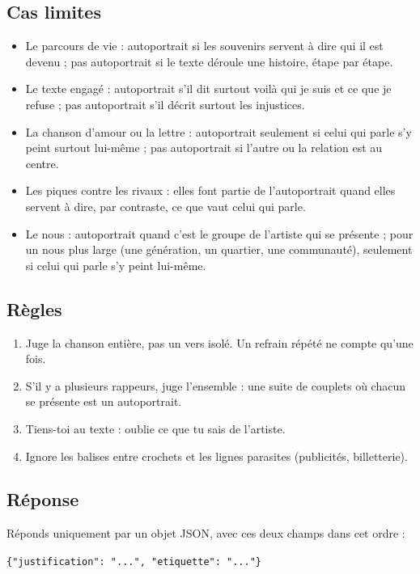 \subsection*{Cas limites}
\begin{itemize}
\item Le parcours de vie : autoportrait si les souvenirs servent à dire qui il est devenu ; pas autoportrait si le texte déroule une histoire, étape par étape.
\item Le texte engagé : autoportrait s'il dit surtout \og voilà qui je suis et ce que je refuse \fg{} ; pas autoportrait s'il décrit surtout les injustices.
\item La chanson d'amour ou la lettre : autoportrait seulement si celui qui parle s'y peint surtout lui-même ; pas autoportrait si l'autre ou la relation est au centre.
\item Les piques contre les rivaux : elles font partie de l'autoportrait quand elles servent à dire, par contraste, ce que vaut celui qui parle.
\item Le \og nous \fg{} : autoportrait quand c'est le groupe de l'artiste qui se présente ; pour un \og nous \fg{} plus large (une génération, un quartier, une communauté), seulement si celui qui parle s'y peint lui-même.
\end{itemize}

\subsection*{Règles}
\begin{enumerate}
\item Juge la chanson entière, pas un vers isolé. Un refrain répété ne compte qu'une fois.
\item S'il y a plusieurs rappeurs, juge l'ensemble : une suite de couplets où chacun se présente est un autoportrait.
\item Tiens-toi au texte : oublie ce que tu sais de l'artiste.
\item Ignore les balises entre crochets et les lignes parasites (publicités, billetterie).
\end{enumerate}

\subsection*{Réponse}
Réponds uniquement par un objet JSON, avec ces deux champs dans cet ordre :

\noindent\texttt{\{"justification": "...", "etiquette": "..."\}}

